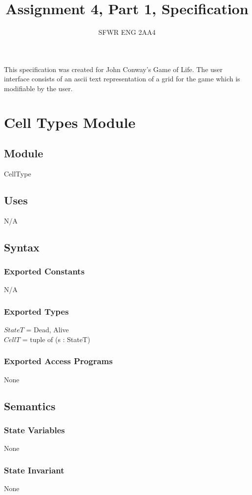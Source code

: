 \documentclass[12pt]{article}
\title{Assignment 4, Part 1, Specification}
\author{SFWR ENG 2AA4}
\begin{document}
\maketitle

This specification was created for John Conway's Game of Life. The user interface consists of an ascii text representation of a grid for the game which is modifiable by the user.

\newpage

\section*{Cell Types Module}
\subsection*{Module}
CellType
\subsection*{Uses}
N/A
\subsection*{Syntax}
\subsubsection*{Exported Constants}
N/A
\subsubsection*{Exported Types}
$ StateT $ = {Dead, Alive}\\
$ CellT $ = tuple of (s : StateT)

\subsubsection*{Exported Access Programs}
None
\subsection*{Semantics}
\subsubsection*{State Variables}
None
\subsubsection*{State Invariant}
None

\newpage
\end{document}
